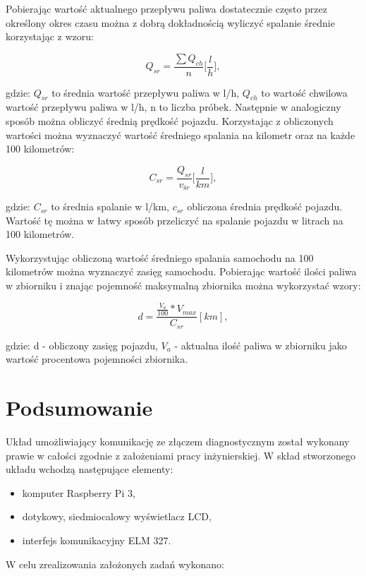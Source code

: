 \documentclass[12pt]{article} %
\numberwithin{equation}{subsection}
\numberwithin{figure}{section}
\numberwithin{table}{section}
\begin{document}
	Pobierając wartość aktualnego przepływu paliwa dostatecznie często przez określony okres czasu można z dobrą dokładnością wyliczyć spalanie średnie korzystając z wzoru:
	
	\begin{equation}
		Q_{sr} = \frac{\sum{Q_{ch}}}{n} \bigg[\frac{l}{h}\bigg],
	\end{equation}		

gdzie: $Q_{sr}$ to średnia wartość przepływu paliwa w l/h, $Q_{ch}$ to wartość chwilowa wartość przepływu paliwa w l/h, n to liczba próbek. Następnie w analogiczny sposób można obliczyć średnią prędkość pojazdu. Korzystając z obliczonych wartości można wyznaczyć wartość średniego spalania na kilometr oraz na każde 100 kilometrów:
	
	\begin{equation}
		C_{sr} = \frac{Q_{sr}}{v_{śr}} \bigg[\frac{l}{km}\bigg],
	\end{equation}

gdzie: $C_{sr}$ to średnia spalanie w l/km, $c_{sr}$ obliczona średnia prędkość pojazdu. Wartość tę można w łatwy sposób przeliczyć na spalanie pojazdu w litrach na 100 kilometrów.

	Wykorzystując obliczoną wartość średniego spalania samochodu na 100 kilometrów można wyznaczyć zasięg samochodu. Pobierając wartość ilości paliwa w zbiorniku i znając pojemność maksymalną zbiornika można wykorzystać wzory:
	
	\begin{equation}
		d = \frac{\frac{V_{a}}{100} * V_{max}}{C_{sr}} [km],
	\end{equation}
	
	gdzie: d - obliczony zasięg pojazdu, $V_{a}$ - aktualna ilość paliwa w zbiorniku jako wartość procentowa pojemności zbiornika.
		
	\newpage
	
	\section{Podsumowanie}
	
	\hspace{0.5cm}Układ umożliwiający komunikację ze złączem diagnostycznym został wykonany prawie w całości zgodnie z założeniami pracy inżynierskiej. W skład stworzonego układu wchodzą następujące elementy:

	\begin{itemize}
		\item{komputer Raspberry Pi 3,}
		\item{dotykowy, siedmiocalowy wyświetlacz LCD,}
		\item{interfejs komunikacyjny ELM 327.}
	\end{itemize}	
	W celu zrealizowania założonych zadań wykonano:
	
\end{document}
